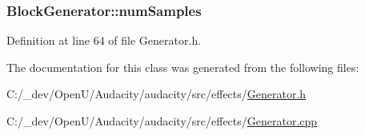 \subsubsection[{\texorpdfstring{num\+Samples}{numSamples}}]{ Block\+Generator\+::num\+Samples\hspace{0.3cm}{\ttfamily [protected]}}\hypertarget{class_block_generator_af1e1458a7b8dab090c3fbac4c7f1dd4e}{}\label{class_block_generator_af1e1458a7b8dab090c3fbac4c7f1dd4e}


Definition at line 64 of file Generator.\+h.



The documentation for this class was generated from the following files\+:\begin{DoxyCompactItemize}
\item 
C\+:/\+\_\+dev/\+Open\+U/\+Audacity/audacity/src/effects/\hyperlink{src_2effects_2_generator_8h}{Generator.\+h}\item 
C\+:/\+\_\+dev/\+Open\+U/\+Audacity/audacity/src/effects/\hyperlink{src_2effects_2_generator_8cpp}{Generator.\+cpp}\end{DoxyCompactItemize}
